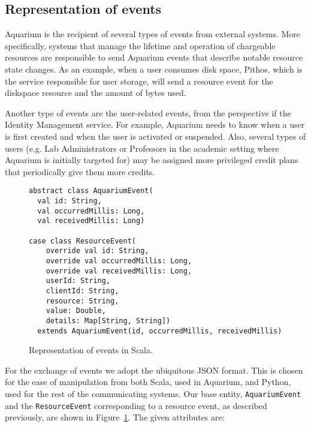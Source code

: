 \documentclass[preprint,10pt]{sigplanconf}
\begin{document}
\subsection{Representation of events}
Aquarium is the recipient of several types of events from external systems. More specifically, systems that manage the lifetime and operation of chargeable resources are responsible to send Aquarium events that describe notable resource state changes. As an example, when a user consumes disk space, Pithos, which is the service responsible for user storage, will send a resource event for the \textsf{diskspace} resource and the amount of bytes used.

Another type of events are the user-related events, from the perspective if the Identity Management service. For example, Aquarium needs to know when a user is first created and when the user is activated or suspended. Also, several types of users (e.g. Lab Administrators or Professors in the academic setting where Aquarium is initially targeted for) may be assigned more privileged credit plans that periodically give them more credits.

\begin{figure}
\lstset{language=c, basicstyle=\footnotesize,
stringstyle=\ttfamily, 
flexiblecolumns=true, aboveskip=-0.9em, belowskip=0em, lineskip=0em}

\begin{lstlisting}
abstract class AquariumEvent(
  val id: String,
  val occurredMillis: Long,
  val receivedMillis: Long)
  
case class ResourceEvent(
    override val id: String,
    override val occurredMillis: Long, 
    override val receivedMillis: Long, 
    userId: String,
    clientId: String,               
    resource: String,
    value: Double,
    details: Map[String, String])
  extends AquariumEvent(id, occurredMillis, receivedMillis)
\end{lstlisting}
\caption{Representation of events in Scala.}
\label{fig:aqevent}
\end{figure}

For the exchange of events we adopt the ubiquitous JSON format. This is chosen for the ease of manipulation from both Scala, used in Aquarium, and Python, used for the rest of the communicating systems. Our base entity, \texttt{AquariumEvent} and the \texttt{ResourceEvent} corresponding to a resource event, as described previously, are shown in Figure~\ref{fig:aqevent}. The given attributes are:
\end{document}
